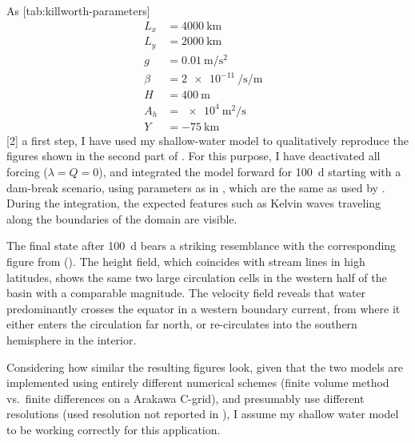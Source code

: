 As%
[tab:killworth-parameters]{%
	\footnotesize%
\begin{align}
	L_x &= \SI{4000}{\kilo\metre}& \\
	L_y &= \SI{2000}{\kilo\metre}& \\
	g &= \SI{0.01}{\metre\per\second\squared}& \\
	\beta &= \SI{2e-11}{\per\second\per\metre}& \\
	H &= \SI{400}{\metre}& \\
	A_h &= \SI{e4}{\metre\squared\per\second}& \\
	Y &= \SI{-75}{\kilo\metre}&
\end{align}
\vspace*{-2\baselineskip}
}[2]%
%
a first step, I have used my shallow-water model to qualitatively reproduce the figures shown in the second part of \cite{killworth}. For this purpose, I have deactivated all forcing (\(\lambda = Q = 0\)), and integrated the model forward for \SI{100}{\day} starting with a dam-break scenario, using parameters as in , which are the same as used by \citeauthor{killworth}. During the integration, the expected features such as Kelvin waves traveling along the boundaries of the domain are visible.

The final state after \SI{100}{\day} bears a striking resemblance with the corresponding figure from \cite{killworth} (). The height field, which coincides with stream lines in high latitudes, shows the same two large circulation cells in the western half of the basin with a comparable magnitude. The velocity field reveals that water predominantly crosses the equator in a western boundary current, from where it either enters the circulation far north, or re-circulates into the southern hemisphere in the interior.

Considering how similar the resulting figures look, given that the two models are implemented using entirely different numerical schemes (finite volume method vs.\ finite differences on a Arakawa C-grid), and presumably use different resolutions (used resolution not reported in \cite{killworth}), I assume my shallow water model to be working correctly for this application.

